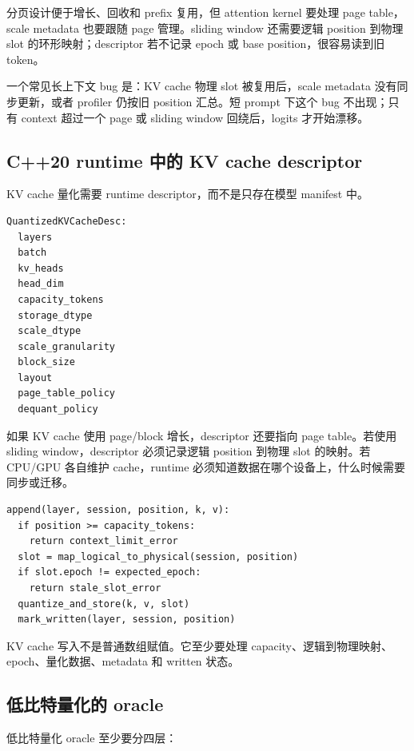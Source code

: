 分页设计便于增长、回收和 prefix 复用，但 attention kernel 要处理 page table，scale metadata 也要跟随 page 管理。sliding window 还需要逻辑 position 到物理 slot 的环形映射；descriptor 若不记录 epoch 或 base position，很容易读到旧 token。

\begin{casebox}
一个常见长上下文 bug 是：KV cache 物理 slot 被复用后，scale metadata 没有同步更新，或者 profiler 仍按旧 position 汇总。短 prompt 下这个 bug 不出现；只有 context 超过一个 page 或 sliding window 回绕后，logits 才开始漂移。
\end{casebox}

\subsection{C++20 runtime 中的 KV cache descriptor}

KV cache 量化需要 runtime descriptor，而不是只存在模型 manifest 中。

\begin{lstlisting}[numbers=none,caption={量化 KV cache 的运行时 descriptor}]
QuantizedKVCacheDesc:
  layers
  batch
  kv_heads
  head_dim
  capacity_tokens
  storage_dtype
  scale_dtype
  scale_granularity
  block_size
  layout
  page_table_policy
  dequant_policy
\end{lstlisting}

如果 KV cache 使用 page/block 增长，descriptor 还要指向 page table。若使用 sliding window，descriptor 必须记录逻辑 position 到物理 slot 的映射。若 CPU/GPU 各自维护 cache，runtime 必须知道数据在哪个设备上，什么时候需要同步或迁移。

\begin{lstlisting}[numbers=none,caption={KV cache append 的边界检查}]
append(layer, session, position, k, v):
  if position >= capacity_tokens:
    return context_limit_error
  slot = map_logical_to_physical(session, position)
  if slot.epoch != expected_epoch:
    return stale_slot_error
  quantize_and_store(k, v, slot)
  mark_written(layer, session, position)
\end{lstlisting}

KV cache 写入不是普通数组赋值。它至少要处理 capacity、逻辑到物理映射、epoch、量化数据、metadata 和 written 状态。

\subsection{低比特量化的 oracle}

低比特量化 oracle 至少要分四层：

